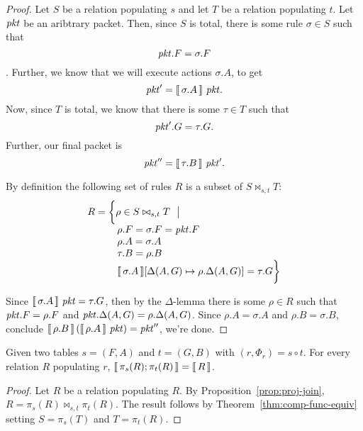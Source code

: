 \begin{proof}
  Let $S$ be a relation populating $s$ and let $T$ be a relation
  populating $t$.
  Let $\mathit{pkt}$ be an aribtrary packet. Then, since $S$ is total, there
  is some rule $\sigma \in S$ such that \[\mathit{pkt}.F = \sigma.F\]. Further, we
  know that we will execute actions $\sigma.A$, to get
  \[\mathit{pkt}' = \llbracket\,\sigma.A\,\rrbracket~\mathit{pkt}.\] Now, since $T$ is total, we know
  that there is some $\tau \in T$ such that \[\mathit{pkt}'.G = \tau.G.\]
  Further, our final packet is \[\mathit{pkt}'' = \llbracket\,\tau.B\,\rrbracket~\mathit{pkt}'.\]

  By definition the following set of rules $R$ is a subset of $S \bowtie_{s,t}T$:
  \[\begin{array}{l}
      R  = \bigg\{\rho \in S \bowtie_{s,t} T~~\big|\\
      \qquad\quad \rho.F = \sigma.F = \mathit{pkt}.F\\
      \qquad\quad \rho.A = \sigma.A \\
      \qquad\quad \tau.B = \rho.B \\
      \qquad\quad \llbracket\,\sigma.A\,\rrbracket[\Delta(A,G) \mapsto \rho.\Delta(A,G)] =\tau.G \bigg\}
    \end{array}\]

  Since $\llbracket\,\sigma.A\,\rrbracket~\mathit{pkt} = \tau.G$, then by the $\Delta$-lemma
  there is some $\rho \in R$ such that $\mathit{pkt}.F = \rho.F$ and
  $\mathit{pkt}.\Delta(A,G) = \rho.\Delta(A,G)$. Since $\rho.A = \sigma.A$ and $\rho.B = \sigma.B$, conclude
  $\llbracket\,\rho.B\,\rrbracket\left(\llbracket\,\rho.A\,\rrbracket~\mathit{pkt}\right) = \mathit{pkt}''$, we're done.
\end{proof}


\begin{theorem}
  \label{thm:decomp-func-equiv}
  Given two tables $s = (F,A)$ and $t = (G,B)$ with
  $(r, \Phi_r) = s \circ t$. For every relation $R$ populating $r$, 
  $\llbracket\,\pi_s(R);\pi_t(R)\,\rrbracket = \llbracket\,R\,\rrbracket$.
\end{theorem}

\begin{proof}
  Let $R$ be a relation populating $R$. By
  Proposition~\ref{prop:proj-join},
  $R = \pi_s(R)\bowtie_{s,t}\pi_t(R)$. The result follows by
  Theorem~\ref{thm:comp-func-equiv} setting $S = \pi_s(T)$ and
  $T=\pi_t(R)$.
\end{proof}
